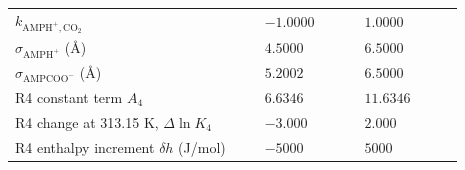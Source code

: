 \begin{table}[!htbp]
\begin{tabular}{@{}>{\raggedright\arraybackslash}p{0.5\linewidth}>{\raggedright\arraybackslash}p{0.2\linewidth}>{\raggedright\arraybackslash}p{0.2\linewidth}@{}}
$k_{\mathrm{AMPH^+,CO_2}}$ & $-1.0000$ & $1.0000$ \\
$\sigma_{\mathrm{AMPH^+}}$ (\AA) & $4.5000$ & $6.5000$ \\
$\sigma_{\mathrm{AMPCOO^-}}$ (\AA) & $5.2002$ & $6.5000$ \\
R4 constant term $A_4$ & $6.6346$ & $11.6346$ \\
R4 change at 313.15 K, $\Delta\ln K_4$ & $-3.000$ & $2.000$ \\
R4 enthalpy increment $\delta h$ (J/mol) & $-5000$ & $5000$ \\
\bottomrule\end{tabular}
\par{}\end{table}
